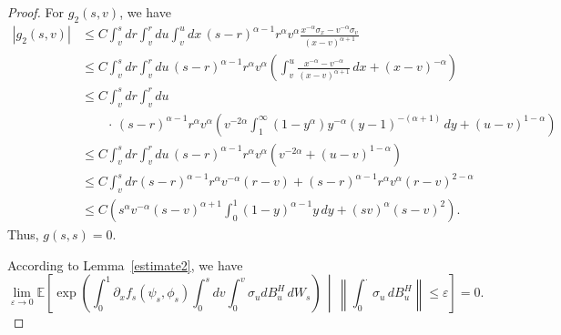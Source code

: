 \documentclass{article}
\theoremstyle{definition}  %
\theoremstyle{plain}  %
\begin{document}
\begin{proof}
For \(g_2(s,v)\), we have
\begin{align*}
    |g_2(s,v)| &\leq C \int_v^s dr \int_v^r du \int_v^u dx \, (s-r)^{\alpha-1} r^\alpha v^\alpha \frac{x^{-\alpha}\sigma_x - v^{-\alpha}\sigma_v}{(x-v)^{\alpha+1}} \\
    &\leq C \int_v^s dr \int_v^r du \, (s-r)^{\alpha-1} r^\alpha v^\alpha \left( \int_v^u \frac{x^{-\alpha} - v^{-\alpha}}{(x-v)^{\alpha+1}} \, dx + (x-v)^{-\alpha} \right) \\
    &\leq C \int_v^s dr \int_v^r du\\
    &\qquad\cdot\, (s-r)^{\alpha-1} r^\alpha v^\alpha \left( v^{-2\alpha} \int_1^\infty (1-y^\alpha)y^{-\alpha} (y-1)^{-(\alpha+1)}  \, dy + (u-v)^{1-\alpha} \right) \\
    &\leq C \int_v^s dr \int_v^r du \, (s-r)^{\alpha-1} r^\alpha v^\alpha \left( v^{-2\alpha} + (u-v)^{1-\alpha} \right) \\
    &\leq C \int_v^s dr (s-r)^{\alpha-1} r^\alpha v^{-\alpha} (r-v) + (s-r)^{\alpha-1} r^\alpha v^\alpha (r-v)^{2-\alpha} \\
    &\leq C \left( s^\alpha v^{-\alpha} (s-v)^{\alpha+1} \int_0^1 (1-y)^{\alpha-1} y \, dy + (sv)^\alpha (s-v)^2 \right).
\end{align*}
Thus, \(g(s,s) = 0\).

According to Lemma~\ref{estimate2}, we have
\begin{equation*}
    \lim_{\varepsilon\to 0} \mathbb{E} \left[ \exp \left( \int_0^1 \partial_x f_s(\psi_s,\phi_s) \int_0^s dv \int_0^v \sigma_u dB^H_u \, dW_s \right) \,\middle|\, \left\| \int_0^\cdot \sigma_u \, dB^H_u \right\| \leq \varepsilon \right] = 0.
\end{equation*}
 
    
\end{proof}
\end{document}
